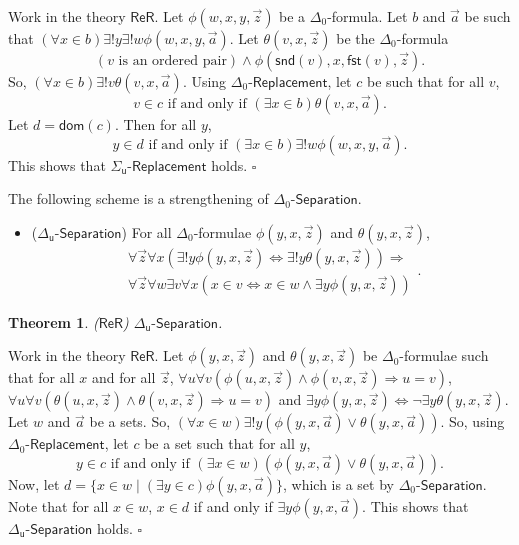 \documentclass[11pt, a4paper]{article}
\newcounter{Theor1}
\newtheorem{theorem}{Theorem}[section]
\newenvironment{proof}[1][Proof]{\begin{trivlist}
\item[\hskip \labelsep {\bfseries #1}]}{\end{trivlist}}
\begin{document}
\begin{proof}
Work in the theory $\mathsf{ReR}$. Let $\phi(w, x, y, \vec{z})$ be a $\Delta_0$-formula. Let $b$ and $\vec{a}$ be such that $(\forall x \in b)\exists! y \exists! w \phi(w, x, y, \vec{a})$. Let $\theta(v, x, \vec{z})$ be the $\Delta_0$-formula
\[
(v \textrm{ is an ordered pair}) \land \phi(\mathsf{snd}(v), x, \mathsf{fst}(v), \vec{z}).
\]
So, $(\forall x \in b) \exists! v \theta(v, x, \vec{a})$. Using $\Delta_0\textsf{-Replacement}$, let $c$ be such that for all $v$,
\[
v \in c \textrm{ if and only if } (\exists x \in b)\theta(v, x, \vec{a}).
\]
Let $d= \mathsf{dom}(c)$. Then for all $y$,
\[
y \in d \textrm{ if and only if } (\exists x \in b) \exists! w \phi(w, x, y, \vec{a}).
\] 
This shows that $\Sigma_{\mathsf{u}}\textsf{-Replacement}$ holds. \hfill$\square$
\end{proof}

The following scheme is a strengthening of $\Delta_0\textsf{-Separation}$.
\begin{itemize}
\item[]($\Delta_{\mathsf{u}}\textsf{-Separation}$) For all $\Delta_0$-formulae $\phi(y, x, \vec{z})$ and $\theta(y, x, \vec{z})$,
\[
\begin{array}{c}
\forall \vec{z} \forall x(\exists! y \phi(y, x, \vec{z}) \iff \exists! y \theta(y, x, \vec{z})) \Rightarrow\\
\forall \vec{z} \forall w \exists v \forall x (x \in v \iff x \in w \land \exists y \phi(y, x, \vec{z}))
\end{array}.
\]
\end{itemize}

\begin{theorem}
($\mathsf{ReR}$) $\Delta_{\mathsf{u}}\textsf{-Separation}$.
\end{theorem}

\begin{proof}
Work in the theory $\mathsf{ReR}$. Let $\phi(y, x, \vec{z})$ and $\theta(y, x, \vec{z})$ be $\Delta_0$-formulae such that for all $x$ and for all $\vec{z}$, $\forall u \forall v(\phi(u, x, \vec{z}) \land \phi(v, x, \vec{z}) \Rightarrow u=v)$, $\forall u \forall v(\theta(u, x, \vec{z}) \land \theta(v, x, \vec{z}) \Rightarrow u=v)$ and $\exists y \phi(y, x, \vec{z}) \iff \neg \exists y \theta(y, x, \vec{z})$. Let $w$ and $\vec{a}$ be a sets. So, $(\forall x \in w) \exists! y(\phi(y, x, \vec{a}) \lor \theta(y, x, \vec{a}))$. So, using $\Delta_0\textsf{-Replacement}$, let $c$ be a set such that for all $y$, 
\[
y \in c \textrm{ if and only if } (\exists x \in w)(\phi(y, x, \vec{a}) \lor \theta(y, x, \vec{a})).
\]
Now, let $d= \{ x \in w \mid (\exists y \in c) \phi(y, x, \vec{a})\}$, which is a set by $\Delta_0\textsf{-Separation}$. Note that for all $x \in w$, $x \in d$ if and only if $\exists y \phi(y, x, \vec{a})$. This shows that $\Delta_{\mathsf{u}}\textsf{-Separation}$ holds. \hfill$\square$    
\end{proof} 
\end{document}

